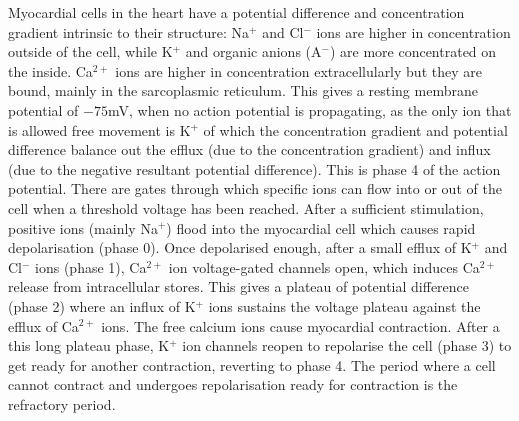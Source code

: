 \documentclass[twocolumn]{article}
\begin{document}
 Myocardial cells in the heart have a potential difference and concentration gradient intrinsic to their structure: Na$^{+}$ and Cl$^{-}$ ions are higher in concentration outside of the cell, while K$^{+}$ and organic anions (A$^{-}$) are more concentrated on the inside. Ca$^{2+}$  ions are higher in concentration extracellularly but they are bound, mainly in the sarcoplasmic reticulum. 
This gives a resting membrane potential of $-75$mV, when no action potential is propagating, as the only ion that is allowed free movement is K$^{+}$ of which the concentration gradient and potential difference balance out the efflux (due to the concentration gradient) and influx (due to the negative resultant potential difference). This is phase 4 of the action potential. There are gates through which specific ions can flow into or out of the cell when a threshold voltage has been reached. After a sufficient stimulation, positive ions (mainly Na$^{+}$)  flood into the myocardial cell which causes rapid depolarisation (phase 0). Once depolarised enough, after a small efflux of K$^{+}$ and  Cl$^{-}$ ions (phase 1), Ca$^{2+}$ ion voltage-gated channels open, which induces Ca$^{2+}$ release from intracellular stores. This gives a plateau of potential difference (phase 2) where an influx of  K$^{+}$ ions sustains the voltage plateau against the efflux of  Ca$^{2+}$ ions. The free calcium ions cause myocardial contraction. After a this long plateau phase,  K$^{+}$ ion channels reopen to repolarise the cell (phase 3) to get ready for another contraction, reverting to phase 4. The period where a cell cannot contract and undergoes repolarisation ready for contraction is the refractory period. 






\end{document}
